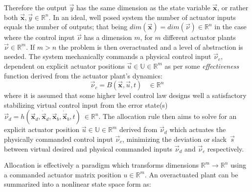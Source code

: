 Therefore the output $\vec{y}$ has the same dimension as the state variable $\vec{\mathbf{x}}$, or rather both $\vec{\mathbf{x}},\vec{y} \in \mathbb{R}^n$. In an ideal, well posed system the number of actuator inputs equals the number of outputs; that being $dim(\vec{\mathbf{x}})=dim(\vec{\nu})\in \mathbb{R}^n$ in the case where the control input $\vec{\nu}$ has a dimension $m$, for $m$ different actuator plants $\vec{\nu} \in \mathbb{R}^m$. If $m>n$ the problem is then overactuated and a level of abstraction is needed. The system mechanically commands a physical control input $\vec{\nu}_c$, dependent on explicit actuator positions $\vec{u}\in\mathbb{U}\in\mathbb{R}^m$ as per some \emph{effectiveness} function derived from the actuator plant's dynamics:
\begin{equation}
\vec{\nu}_c=B(\vec{\mathbf{x}},\vec{u},t)~~~~\in\mathbb{R}^n
\end{equation}
where it is assumed that some higher level control law designs well a satisfactory stabilizing virtual control input from the error state(s) $\vec{\nu}_d=h(\vec{\mathbf{x}}_d,\dot{\vec{\mathbf{x}}}_d,\vec{\mathbf{x}}_b,\dot{\vec{\mathbf{x}}}_b,t)~\in\mathbb{R}^n$. The allocation rule then aims to solve for an explicit actuator position $\vec{u}\in\mathbb{U}\in\mathbb{R}^m$ derived from $\vec{\nu}_d$ which actuates the physically commanded control input $\vec{\nu}_c$, minimizing the deviation or slack~$\vec{s}$ between virtual desired and physical commanded inputs $\vec{\nu}_d$ and $\vec{\nu}_c$ respectively. 
\par
Allocation is effectively a paradigm which transforms dimensions $\mathbb{R}^m\rightarrow\mathbb{R}^n$ using a commanded actuator matrix position $u\in\mathbb{R}^m$. An overactuated plant can be summarized into a nonlinear state space form as:
